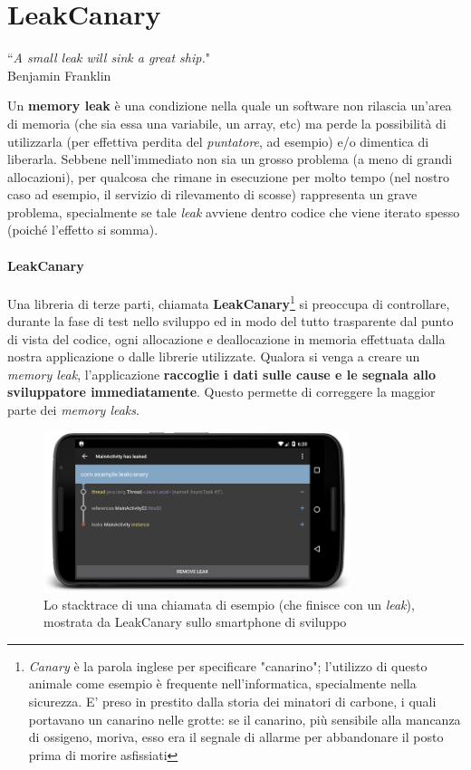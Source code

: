 \documentclass[a4paper,10pt]{memoir}
\begin{document}
\section{LeakCanary}

\begin{flushright}
``\textit{A small leak will sink a great ship.}" \\ Benjamin Franklin
\end{flushright}

\medskip

Un \textbf{memory leak} è una condizione nella quale un software non rilascia un'area di memoria (che sia essa una variabile, un array, etc) ma perde la possibilità di utilizzarla (per effettiva perdita del \textit{puntatore}, ad esempio) e/o dimentica di liberarla. Sebbene nell'immediato non sia un grosso problema (a meno di grandi allocazioni), per qualcosa che rimane in esecuzione per molto tempo (nel nostro caso ad esempio, il servizio di rilevamento di scosse) rappresenta un grave problema, specialmente se tale \textit{leak} avviene dentro codice che viene iterato spesso (poiché l'effetto si somma).

\paragraph{LeakCanary} Una libreria di terze parti, chiamata \textbf{LeakCanary}\footnote{\textit{Canary} è la parola inglese per specificare "canarino"; l'utilizzo di questo animale come esempio è frequente nell'informatica, specialmente nella sicurezza. E' preso in prestito dalla storia dei minatori di carbone, i quali portavano un canarino nelle grotte: se il canarino, più sensibile alla mancanza di ossigeno, moriva, esso era il segnale di allarme per abbandonare il posto prima di morire asfissiati} si preoccupa di controllare, durante la fase di test nello sviluppo ed in modo del tutto trasparente dal punto di vista del codice, ogni allocazione e deallocazione in memoria effettuata dalla nostra applicazione o dalle librerie utilizzate. Qualora si venga a creare un \textit{memory leak}, l'applicazione \textbf{raccoglie i dati sulle cause e le segnala allo sviluppatore immediatamente}. Questo permette di correggere la maggior parte dei \textit{memory leaks}.


\begin{figure}[ht]
\centering
\includegraphics[width=0.8\textwidth]{dev/leakcanary}
\caption{Lo stacktrace di una chiamata di esempio (che finisce con un \textit{leak}), mostrata da LeakCanary sullo smartphone di sviluppo}
\end{figure}
\end{document}

